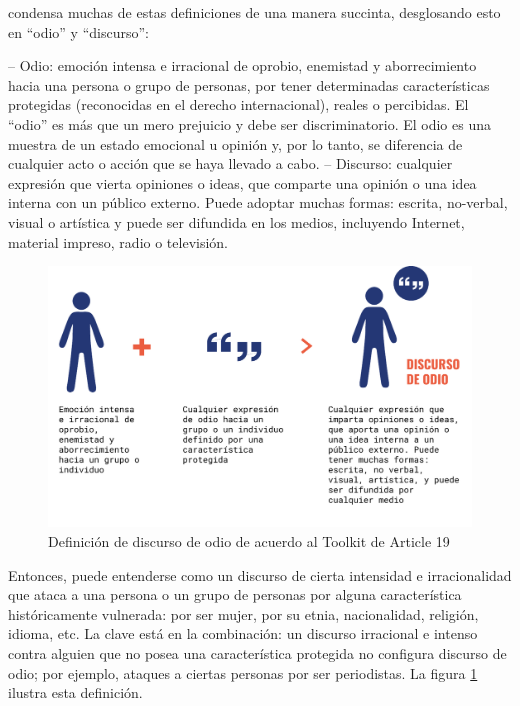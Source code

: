 \citet{article192015} condensa muchas de estas definiciones de una manera succinta, desglosando esto en ``odio'' y ``discurso'':

\begin{displayquote}

    – Odio: emoción intensa e irracional de oprobio, enemistad y aborrecimiento hacia una persona o grupo de personas, por tener determinadas características protegidas (reconocidas en el derecho internacional), reales o percibidas. El “odio” es más que un mero prejuicio y debe ser discriminatorio. El odio es una muestra de un estado emocional u opinión y, por lo tanto, se diferencia de cualquier acto o acción que se haya llevado a cabo.
    – Discurso: cualquier expresión que vierta opiniones o ideas, que comparte una
    opinión o una idea interna con un público externo. Puede adoptar muchas
    formas: escrita, no-verbal, visual o artística y puede ser difundida en los
    medios, incluyendo Internet, material impreso, radio o televisión.
\end{displayquote}


\begin{figure}[t]
    \centering
    \includegraphics[width=\textwidth]{img/discurso_de_odio.pdf}
    \caption{Definición de discurso de odio de acuerdo al Toolkit de Article 19}
    \label{fig:hate_speech_definition_article_19}
\end{figure}


Entonces, puede entenderse como un discurso de cierta intensidad e irracionalidad que ataca a una persona o un grupo de personas por alguna característica históricamente vulnerada: por ser mujer, por su etnia, nacionalidad, religión, idioma, etc. La clave está en la combinación: un discurso irracional e intenso contra alguien que no posea una característica protegida no configura discurso de odio; por ejemplo, ataques a ciertas personas por ser periodistas. La figura \ref{fig:hate_speech_definition_article_19} ilustra esta definición.


